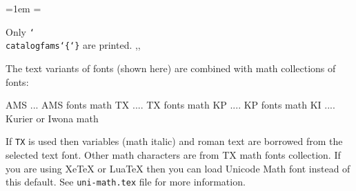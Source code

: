 \parindent=1em
\ifx\sizespec\empty \def\sizespec{at10pt}\fi
{}\currtt=\tentt
\ifx\loadmathfonts\undefined \let\loadmathfonts=\relax \fi
\let\fontfamexec=\fontfamexecC
\ifx\fontfamsample\undefined
   \def\fontfamsample{ABCDabcd Qsty fi fl áéíóúüů řžč ÁÉÍÓÚ ŘŽČ 0123456789}
   \ifx\chyph\undefined \ismacro{}\iftrue
   \def\fontfamsample{ABCDabcd Qsty fi fl 
      \char225\char233\char237\char243\char250\char252\char183{ }%
      \char176\char186\char163{ }%
      \char193\char201\char205\char211\char218\char220\char151{ }%
      \char144\char154\char130{ }0123456789}     
\fi\fi\fi
\def\detok#1{\expandafter\detokA\meaning#1}\def\detokA#1->{}

\ifx\catalogfams\undefined \else
   {Only \tt\char`\\catalogfams\char`\{\catalogfams\char`\}}
   are printed.\medskip
   \edef\catalogfams{\catalogfams\space{} }
   \def\fsname{}\expandafter \setfsname \catalogfams
   \def\fontfamL{}\expandafter \catalogfamsA \fsname,,\fi

\fontfamL
\endgroup

\bigskip
\noindent
The text variants of fonts (shown here) are combined with math collections
of fonts:

\begtt
AMS ... AMS fonts math
TX .... TX fonts math
KP .... KP fonts math
KI .... Kurier or Iwona math
\endtt

If {\tt TX} is used then variables (math italic) and roman text are borrowed
from the selected text font. Other math characters are from TX math fonts
collection.
If you are using Xe\TeX{} or Lua\TeX{} then you can load Unicode Math font
instead of this default. See {\tt uni-math.tex} file for more information.


\endinput

